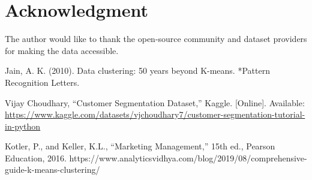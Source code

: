\documentclass[conference]{IEEEtran}
\begin{document}
\section*{Acknowledgment}
The author would like to thank the open-source community and dataset providers for making the data accessible.
\begin{thebibliography}{1}

 Jain, A. K. (2010). Data clustering: 50 years beyond K-means. *Pattern Recognition Letters.

Vijay Choudhary, “Customer Segmentation Dataset,” Kaggle. [Online]. Available: \url{https://www.kaggle.com/datasets/vjchoudhary7/customer-segmentation-tutorial-in-python}

Kotler, P., and Keller, K.L., “Marketing Management,” 15th ed., Pearson Education, 2016.
https://www.analyticsvidhya.com/blog/2019/08/comprehensive-guide-k-means-clustering/

\end{thebibliography}
\end{document}
